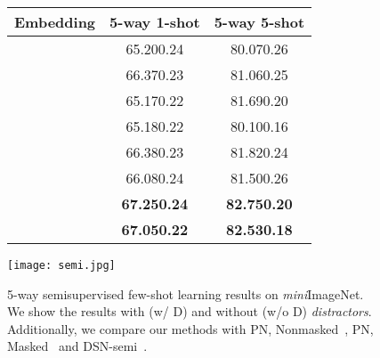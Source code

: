\documentclass{SCIS2019}
\makeatletter
\newcommand\figcaption{\def\@captype{figure}\caption}
\newcommand\tabcaption{\def\@captype{table}\caption}
\makeatother
\begin{document}
	\begin{figure}
		\begin{minipage}{0.5\linewidth}
			\tabcaption{5-way, 1-shot and 5-shot recognition accuracy (\%) with different numbers of image patches on \emph{mini}ImageNet.}
			\begin{tabular}[t]{ccc}
				\toprule
				\label{number}
				Embedding     
				&5-way 1-shot & 5-way 5-shot\\
				\midrule	
				 &65.20\footnotesize{0.24} &80.07\footnotesize{0.26} \\
				 &66.37\footnotesize{0.23} &81.06\footnotesize{0.25} \\
				 &65.17\footnotesize{0.22} &81.69\footnotesize{0.20} \\
				 &65.18\footnotesize{0.22} &80.10\footnotesize{0.16} \\
				 &66.38\footnotesize{0.23} &81.82\footnotesize{0.24} \\	
				 &66.08\footnotesize{0.24} &81.50\footnotesize{0.26} \\
				 &\textbf{67.25\footnotesize{0.24}} &\textbf{82.75\footnotesize{0.20}} \\	
				 &\textbf{67.05\footnotesize{0.22}} & \textbf{82.53\footnotesize{0.18}} \\
				\bottomrule
			\end{tabular}
			
		\end{minipage}
		\begin{minipage}{0.45\linewidth}
			\centering
			\texttt{[image: semi.jpg]} \figcaption{
				5-way semisupervised few-shot learning results on \emph{mini}ImageNet. We show the results with (w/ D) and without (w/o D) \emph{distractors}. Additionally, we compare our methods with PN, Nonmasked~\cite{32}, PN, Masked~\cite{32} and DSN-semi~\cite{25}.}
			\label{fig3}
		\end{minipage}
	\end{figure}
	
\end{document}
